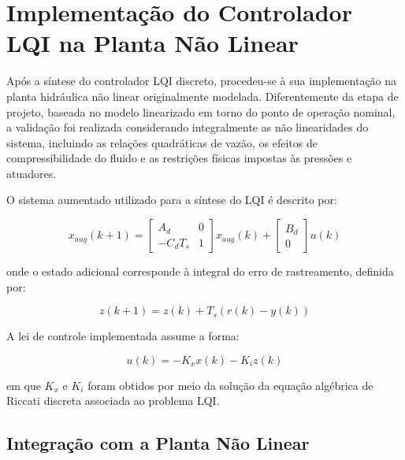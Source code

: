 
\section{Implementação do Controlador LQI na Planta Não Linear}

Após a síntese do controlador LQI discreto, procedeu-se à sua implementação na planta hidráulica não linear originalmente modelada. Diferentemente da etapa de projeto, baseada no modelo linearizado em torno do ponto de operação nominal, a validação foi realizada considerando integralmente as não linearidades do sistema, incluindo as relações quadráticas de vazão, os efeitos de compressibilidade do fluido e as restrições físicas impostas às pressões e atuadores.

O sistema aumentado utilizado para a síntese do LQI é descrito por:

\begin{equation}
x_{aug}(k+1) =
\begin{bmatrix}
A_d & 0 \\
- C_d T_s & 1
\end{bmatrix}
x_{aug}(k)
+
\begin{bmatrix}
B_d \\
0
\end{bmatrix}
u(k)
\end{equation}

onde o estado adicional corresponde à integral do erro de rastreamento, definida por:

\begin{equation}
z(k+1) = z(k) + T_s \left( r(k) - y(k) \right)
\end{equation}

A lei de controle implementada assume a forma:

\begin{equation}
u(k) = -K_x x(k) - K_i z(k)
\end{equation}

em que $K_x$ e $K_i$ foram obtidos por meio da solução da equação algébrica de Riccati discreta associada ao problema LQI.

\subsection{Integração com a Planta Não Linear}

